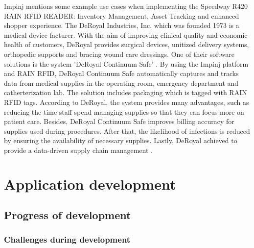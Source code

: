 Impinj mentions some example use cases when implementing the Speedway R420 RAIN RFID READER: Inventory Management, Asset Tracking and enhanced shopper experience. 
The DeRoyal Industries, Inc. which was founded 1973 is a medical device facturer\cite{deroyal}. With the aim of improving clinical quality and economic health of customers, DeRoyal provides surgical devices, unitized delivery systems, orthopedic supports and bracing wound care dressings. One of their software solutions is the system 'DeRoyal Continuum Safe' \cite{deroyal}. By using the Impinj platform and RAIN RFID, DeRoyal Continuum Safe automatically captures and tracks data from medical supplies in the operating room, emergency department and catherterization lab. The solution includes packaging which is tagged with RAIN RFID tags. According to DeRoyal, the system provides many advantages, such as reducing the time staff spend managing supplies so that they can focus more on patient care. Besides, DeRoyal Continuum Safe improves billing accuracy for supplies used during procedures. After that, the likelihood of infections is reduced by ensuring the availability of necessary supplies. Lastly, DeRoyal achieved to provide a data-driven supply chain management \cite{deroyal}. 

\section{Application development} \label{app_development}

\subsection{Progress of development}

\subsubsection{Challenges during development} \label{challenge}

